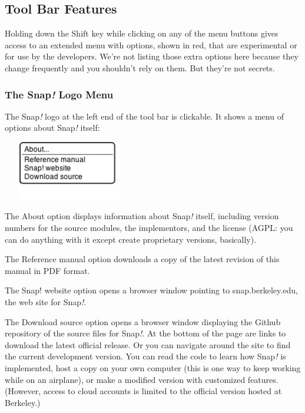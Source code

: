 \subsection{Tool Bar Features}\label{tool-bar-features}

Holding down the Shift key while clicking on any of the menu buttons
gives access to an extended menu with options, shown in red, that are
experimental or for use by the developers. We're not listing those extra
options here because they change frequently and you shouldn't rely on
them. But they're not secrets.

\subsubsection{\texorpdfstring{The Snap\emph{!} Logo
Menu}{The Snap! Logo Menu}}\label{the-snap-logo-menu}

The Snap\emph{!} logo at the left end of the tool bar is clickable. It
shows a menu of options about Snap\emph{!} itself:

\includegraphics[width=2.32922in,height=1.02in]{media/image994.png}

The About option displays information about Snap\emph{!} itself,
including version numbers for the source modules, the implementors, and
the license (AGPL: you can do anything with it except create proprietary
versions, basically).

The Reference manual option downloads a copy of the latest revision of
this manual in PDF format.

The Snap! website option opens a browser window pointing to
snap.berkeley.edu, the web site for Snap\emph{!}.

The Download source option opens a browser window displaying the Github
repository of the source files for Snap\emph{!}. At the bottom of the
page are links to download the latest official release. Or you can
navigate around the site to find the current development version. You
can read the code to learn how Snap\emph{!} is implemented, host a copy
on your own computer (this is one way to keep working while on an
airplane), or make a modified version with customized features.
(However, access to cloud accounts is limited to the official version
hosted at Berkeley.)

